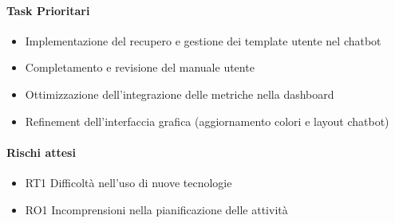 \documentclass{article}
\begin{document}
            
            \paragraph{Task Prioritari}  
            \begin{itemize}  
                \item Implementazione del recupero e gestione dei template utente nel chatbot  
                \item Completamento e revisione del manuale utente  
                \item Ottimizzazione dell'integrazione delle metriche nella dashboard  
                \item Refinement dell'interfaccia grafica (aggiornamento colori e layout chatbot)  
            \end{itemize}  
            
            \paragraph{Rischi attesi}  
            \begin{itemize}  
                \item RT1 Difficoltà nell’uso di nuove tecnologie  
                \item RO1 Incomprensioni nella pianificazione delle attività  
            \end{itemize}
\end{document}
